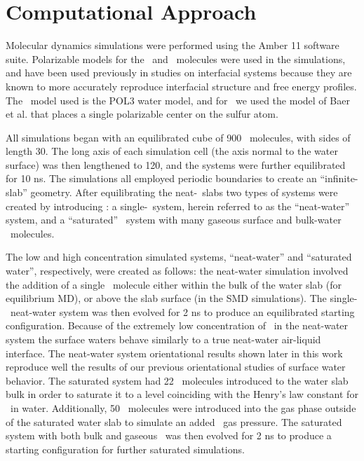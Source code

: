 \documentclass{article}
\begin{document}
\section{Computational Approach}

Molecular dynamics simulations were performed using the Amber 11 software suite.\cite{Case2010} Polarizable models for the \wat~and \suldiox~molecules were used in the simulations, and have been used previously in studies on interfacial systems because they are known to more accurately reproduce interfacial structure and free energy profiles.\cite{Wick2007,Rivera2006,Dang1998} The \wat~model used is the POL3 water model,\cite{Caldwell1995} and for \suldiox~we used the model of Baer et al. that places a single polarizable center on the sulfur atom.\cite{Baer2010}

All simulations began with an equilibrated cube of 900 \wat~molecules, with sides of length 30\angs. The long axis of each simulation cell (the axis normal to the water surface) was then lengthened to 120\angs, and the systems were further equilibrated for 10 ns. The simulations all employed periodic boundaries to create an ``infinite-slab'' geometry. After equilibrating the neat-\wat~slabs two types of systems were created by introducing \suldiox: a single-\suldiox~system, herein referred to as the ``neat-water'' system, and a ``saturated'' \suldiox~system with many gaseous surface and bulk-water \suldiox~molecules.

The low and high concentration simulated systems, ``neat-water'' and ``saturated water'', respectively, were created as follows: the neat-water simulation involved the addition of a single \suldiox~molecule either within the bulk of the water slab (for equilibrium MD), or above the slab surface (in the SMD simulations). The single-\suldiox~neat-water system was then evolved for 2 ns to produce an equilibrated starting configuration. Because of the extremely low concentration of \suldiox~in the neat-water system the surface waters behave similarly to a true neat-water air-liquid interface. The neat-water system orientational results shown later in this work reproduce well the results of our previous orientational studies of surface water behavior.\cite{Walker2006b,Hore2008} The saturated system had 22 \suldiox~molecules introduced to the water slab bulk in order to saturate it to a level coinciding with the Henry's law constant for \suldiox~in water. Additionally, 50 \suldiox~molecules were introduced into the gas phase outside of the saturated water slab to simulate an added \suldiox~gas pressure. The saturated system with both bulk and gaseous \suldiox~was then evolved for 2 ns to produce a starting configuration for further saturated simulations.
\end{document}
